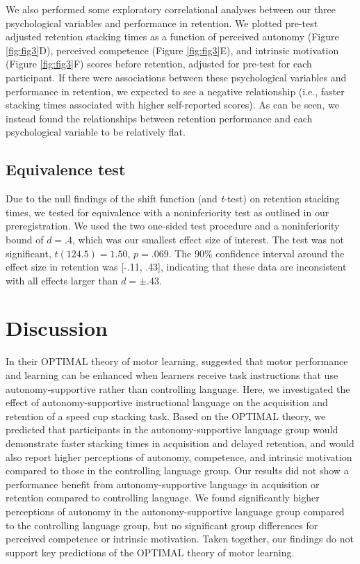 \documentclass[doc,floatsintext,donotrepeattitle,letterpaper,12pt]{apa7}
\begin{document}
\clearpage

We also performed some exploratory correlational analyses between our three psychological variables and performance in retention. We plotted pre-test adjusted retention stacking times as a function of perceived autonomy (Figure \ref{fig:fig3}D), perceived competence (Figure \ref{fig:fig3}E), and intrinsic motivation (Figure \ref{fig:fig3}F) scores before retention, adjusted for pre-test for each participant. If there were associations between these psychological variables and performance in retention, we expected to see a negative relationship (i.e., faster stacking times associated with higher self-reported scores). As can be seen, we instead found the relationships between retention performance and each psychological variable to be relatively flat.

\subsection{Equivalence test}

Due to the null findings of the shift function (and \emph{t}-test) on retention stacking times, we tested for equivalence with a noninferiority test as outlined in our preregistration. We used the two one-sided test procedure \autocite{schuirmann1987} and a noninferiority bound of $d = .4$, which was our smallest effect size of interest. The test was not significant, $t(124.5) = 1.50$, $p = .069$. The 90\% confidence interval around the effect size in retention was [-.11, .43], indicating that these data are inconsistent with all effects larger than $d = \pm.43$.

\section{Discussion}

In their OPTIMAL theory of motor learning, \textcite{wulf2016} suggested that motor performance and learning can be enhanced when learners receive task instructions that use autonomy-supportive rather than controlling language. Here, we investigated the effect of autonomy-supportive instructional language on the acquisition and retention of a speed cup stacking task. Based on the OPTIMAL theory, we predicted that participants in the autonomy-supportive language group would demonstrate faster stacking times in acquisition and delayed retention, and would also report higher perceptions of autonomy, competence, and intrinsic motivation compared to those in the controlling language group. Our results did not show a performance benefit from autonomy-supportive language in acquisition or retention compared to controlling language. We found significantly higher perceptions of autonomy in the autonomy-supportive language group compared to the controlling language group, but no significant group differences for perceived competence or intrinsic motivation. Taken together, our findings do not support key predictions of the OPTIMAL theory of motor learning.
\end{document}
